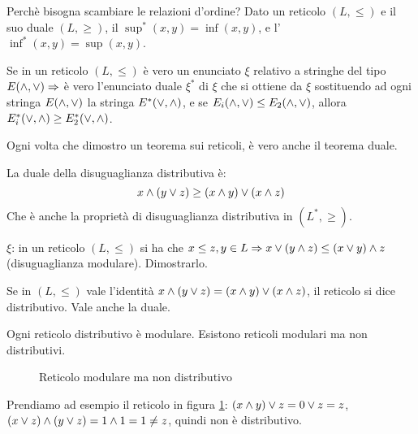 Perch\`e bisogna scambiare le relazioni d'ordine? Dato un reticolo $(L, \le)$ e il suo duale $(L, \ge)$, il $\sup^{\ast} (x,y) = \inf(x,y)$, e l'$\inf^{\ast}(x,y) = \sup(x,y)$.

\begin{theorem}[Dualit\`a]
Se in un reticolo $(L, \le)$ \`e vero un enunciato $\xi$ relativo a stringhe del tipo $E(\wedge, \vee) \Rightarrow $ \`e vero l'enunciato duale $\xi^{\ast}$ di $\xi$ che si ottiene da $\xi$ sostituendo ad ogni stringa $E(\wedge, \vee)$ la stringa $E^{\ast}(\vee, \wedge)$, e se $E_i (\wedge, \vee) \le E_2 (\wedge, \vee)$, allora $E_i^{\ast} (\vee, \wedge) \ge E_2^{\ast} (\vee, \wedge)$.
\end{theorem}
Ogni volta che dimostro un teorema sui reticoli, \`e vero anche il teorema duale. 

La duale della disuguaglianza distributiva \`e:
\[
x \wedge (y \vee z) \ge (x \wedge y) \vee (x \wedge z)
\]
Che \`e anche la propriet\`a di disuguaglianza distributiva in $(L^{\ast}, \ge)$.

\begin{esercizio}
$\xi$: in un reticolo $(L, \le)$ si ha che $x \le z, y \in L \Rightarrow x \vee (y \wedge z) \le (x \vee y) \wedge z$ (disuguaglianza modulare). Dimostrarlo.

\vspace{5cm}
\end{esercizio}

\begin{defn}
Se in $(L, \le)$ vale l'identit\`a $x \wedge (y \vee z) = (x \wedge y) \vee (x \wedge z)$, il reticolo si dice distributivo. Vale anche la duale.
\end{defn}

Ogni reticolo distributivo \`e modulare. Esistono reticoli modulari ma non distributivi.

\begin{figure}[ht]
\centering
{}
\caption{\label{fig:mod_not_distr}Reticolo modulare ma non distributivo}
\end{figure}
Prendiamo ad esempio il reticolo in figura \ref{fig:mod_not_distr}: $(x \wedge y) \vee z = 0 \vee z = z$, $(x \vee z) \wedge (y \vee z) = 1 \wedge 1 = 1 \neq z$, quindi non \`e distributivo. 


